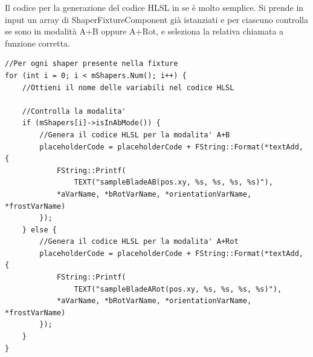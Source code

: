 \documentclass[main.tex]{subfiles}
\begin{document}
Il codice per la generazione del codice HLSL in se è molto semplice. Si prende in input un array di ShaperFixtureComponent già istanziati e per ciascuno controlla se sono in modalità A+B oppure A+Rot, e seleziona la relativa chiamata a funzione corretta.
\begin{lstlisting}
//Per ogni shaper presente nella fixture
for (int i = 0; i < mShapers.Num(); i++) {
    //Ottieni il nome delle variabili nel codice HLSL

    //Controlla la modalita'
    if (mShapers[i]->isInAbMode()) {
        //Genera il codice HLSL per la modalita' A+B
        placeholderCode = placeholderCode + FString::Format(*textAdd, {
            FString::Printf(
                TEXT("sampleBladeAB(pos.xy, %s, %s, %s, %s)"),
            *aVarName, *bRotVarName, *orientationVarName, *frostVarName)
        });
    } else {
        //Genera il codice HLSL per la modalita' A+Rot
        placeholderCode = placeholderCode + FString::Format(*textAdd, {
            FString::Printf(
                TEXT("sampleBladeARot(pos.xy, %s, %s, %s, %s)"),
            *aVarName, *bRotVarName, *orientationVarName, *frostVarName)
        });
    }
}
\end{lstlisting}
\end{document}
